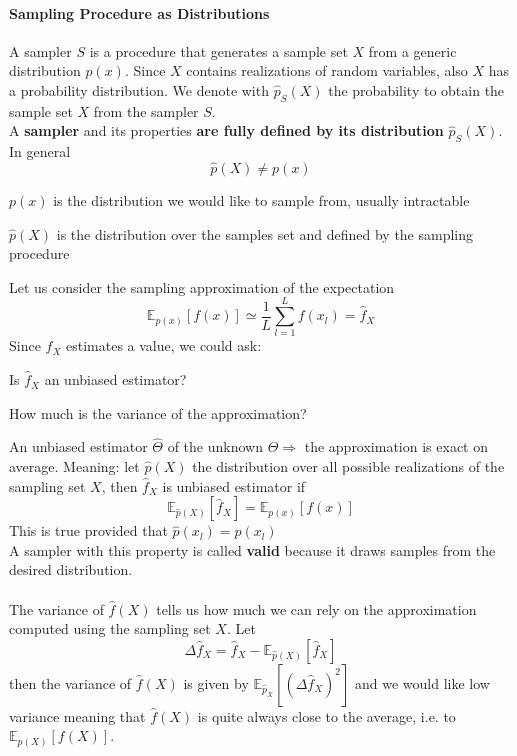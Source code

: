 \documentclass[10pt]{report}
\begin{document}
\paragraph{Sampling Procedure as Distributions} A sampler $S$ is a procedure that generates a sample set $X$ from a generic distribution $p(x)$. Since $X$ contains realizations of random variables, also $X$ has a probability distribution. We denote with $\hat{p}_S(X)$ the probability to obtain the sample set $X$ from the sampler $S$.\\
A \textbf{sampler} and its properties \textbf{are fully defined by its distribution} $\hat{p}_S(X)$. In general
$$\hat{p}(X) \neq p(x)$$
\begin{list}{}{}
	\item $p(x)$ is the distribution we would like to sample from, usually intractable
	\item $\hat{p}(X)$ is the distribution over the samples set and defined by the sampling procedure
\end{list}
Let us consider the sampling approximation of the expectation
$$\mathbb{E}_{p(x)}[f(x)]\simeq \frac{1}{L}\sum_{l=1}^L f(x_l) = \hat{f}_X$$
Since $\hat{f}_X$ estimates a value, we could ask:
\begin{list}{}{}
	\item Is $\hat{f}_X$ an unbiased estimator?
	\item How much is the variance of the approximation?
\end{list}
An unbiased estimator $\hat{\Theta}$ of the unknown $\Theta \Rightarrow$ the approximation is exact on average. Meaning: let $\hat{p}(X)$ the distribution over all possible realizations of the sampling set $X$, then $\hat{f}_X$ is unbiased estimator if $$\mathbb{E}_{\hat{p}(X)}[\hat{f}_X] = \mathbb{E}_{p(x)}[f(x)]$$
This is true provided that $\hat{p}(x_l) = p(x_l)$\\
A sampler with this property is called \textbf{valid} because it draws samples from the desired distribution.\\\\
The variance of $\hat{f}(X)$ tells us how much we can rely on the approximation computed using the sampling set $X$. Let $$\Delta\hat{f}_X = \hat{f}_X - \mathbb{E}_{\hat{p}(X)}[\hat{f}_X]$$ then the variance of $\hat{f}(X)$ is given by $\mathbb{E}_{\hat{p}_X}[(\Delta\hat{f}_X)^2]$ and we would like low variance meaning that $\hat{f}(X)$ is quite always close to the average, i.e. to $\mathbb{E}_{p(X)}[f(X)]$.\\\\
\end{document}
